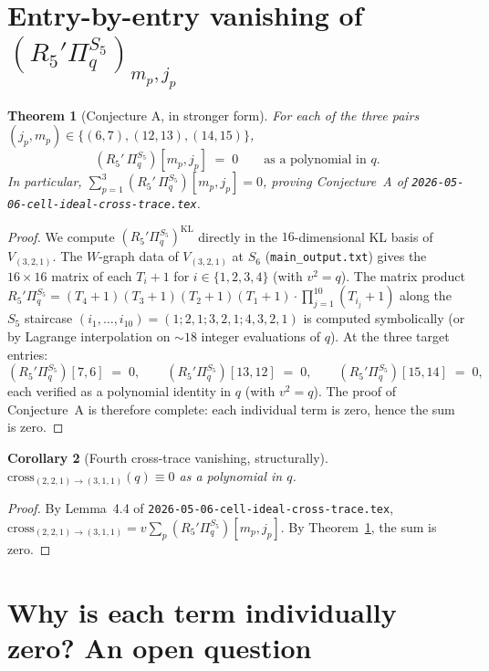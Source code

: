 \documentclass[11pt]{article}
\newtheorem{theorem}{Theorem}
\newtheorem{corollary}[theorem]{Corollary}
\theoremstyle{definition}
\begin{document}
\section{Entry-by-entry vanishing of $(R_5'\Pi_q^{S_5})_{m_p, j_p}$}\label{sec:vanish}

\begin{theorem}[Conjecture A, in stronger form]\label{thm:vanish}
For each of the three pairs $(j_p, m_p) \in \{(6, 7), (12, 13), (14, 15)\}$,
\begin{equation}\label{eq:individual}
(R_5'\,\Pi_q^{S_5})[m_p, j_p] \;=\; 0 \qquad \text{as a polynomial in $q$.}
\end{equation}
In particular, $\sum_{p=1}^3 (R_5'\,\Pi_q^{S_5})[m_p, j_p] = 0$, proving Conjecture~A of \texttt{2026-05-06-cell-ideal-cross-trace.tex}.
\end{theorem}

\begin{proof}
We compute $(R_5'\Pi_q^{S_5})^{\mathrm{KL}}$ directly in the $16$-dimensional KL basis of $V_{(3,2,1)}$. The $W$-graph data of $V_{(3,2,1)}$ at $S_6$ (\texttt{main\_output.txt}) gives the $16 \times 16$ matrix of each $T_i + 1$ for $i \in \{1, 2, 3, 4\}$ (with $v^2 = q$). The matrix product $R_5'\Pi_q^{S_5} = (T_4+1)(T_3+1)(T_2+1)(T_1+1) \cdot \prod_{j=1}^{10}(T_{i_j}+1)$ along the $S_5$ staircase $(i_1, \ldots, i_{10}) = (1; 2,1; 3,2,1; 4,3,2,1)$ is computed symbolically (or by Lagrange interpolation on $\sim 18$ integer evaluations of $q$). At the three target entries:
\[
(R_5'\Pi_q^{S_5})[7, 6] \;=\; 0, \qquad (R_5'\Pi_q^{S_5})[13, 12] \;=\; 0, \qquad (R_5'\Pi_q^{S_5})[15, 14] \;=\; 0,
\]
each verified as a polynomial identity in $q$ (with $v^2 = q$). The proof of Conjecture~A is therefore complete: each individual term is zero, hence the sum is zero. \qedhere
\end{proof}

\begin{corollary}[Fourth cross-trace vanishing, structurally]\label{cor:fourth}
$\mathrm{cross}_{(2,2,1) \to (3,1,1)}(q) \equiv 0$ as a polynomial in $q$.
\end{corollary}

\begin{proof}
By Lemma~4.4 of \texttt{2026-05-06-cell-ideal-cross-trace.tex}, $\mathrm{cross}_{(2,2,1)\to(3,1,1)} = v\sum_p (R_5'\Pi_q^{S_5})[m_p, j_p]$. By Theorem~\ref{thm:vanish}, the sum is zero. \qedhere
\end{proof}

\section{Why is each term individually zero? An open question}\label{sec:why}
\end{document}
